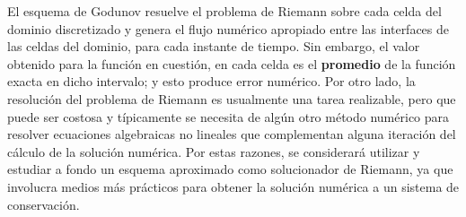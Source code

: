 El esquema de Godunov resuelve el problema de Riemann sobre cada celda del dominio discretizado y genera el flujo numérico apropiado entre las interfaces de las celdas del dominio, para cada instante de tiempo. Sin embargo, el valor obtenido para la función en cuestión, en cada celda es el \textbf{promedio} de la función exacta en dicho intervalo; y esto produce error numérico. Por otro lado, la resolución del problema de Riemann es usualmente una tarea realizable, pero que puede ser costosa y típicamente se necesita de algún otro método numérico para resolver ecuaciones algebraicas no lineales que complementan alguna iteración del cálculo de la solución numérica. Por estas razones, se considerará utilizar y estudiar a fondo un esquema aproximado como solucionador de Riemann, ya que involucra medios más prácticos para obtener la solución numérica a un sistema de conservación.

